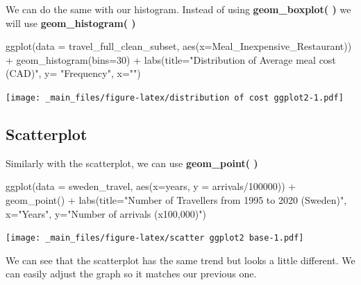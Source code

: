 \documentclass[
]{book}
\newenvironment{Shaded}{\begin{snugshade}}{\end{snugshade}}
\newcommand{\AttributeTok}[1]{\textcolor[rgb]{0.77,0.63,0.00}{#1}}
\newcommand{\DecValTok}[1]{\textcolor[rgb]{0.00,0.00,0.81}{#1}}
\newcommand{\FunctionTok}[1]{\textcolor[rgb]{0.00,0.00,0.00}{#1}}
\newcommand{\NormalTok}[1]{#1}
\newcommand{\SpecialCharTok}[1]{\textcolor[rgb]{0.00,0.00,0.00}{#1}}
\newcommand{\StringTok}[1]{\textcolor[rgb]{0.31,0.60,0.02}{#1}}
\begin{document}
We can do the same with our histogram. Instead of using \textbf{geom\_boxplot( )} we will use \textbf{geom\_histogram( )}

\begin{Shaded}
\begin{Highlighting}[]
\FunctionTok{ggplot}\NormalTok{(}\AttributeTok{data =}\NormalTok{ travel\_full\_clean\_subset, }\FunctionTok{aes}\NormalTok{(}\AttributeTok{x=}\NormalTok{Meal\_Inexpensive\_Restaurant)) }\SpecialCharTok{+} 
  \FunctionTok{geom\_histogram}\NormalTok{(}\AttributeTok{bins=}\DecValTok{30}\NormalTok{) }\SpecialCharTok{+}
  \FunctionTok{labs}\NormalTok{(}\AttributeTok{title=}\StringTok{"Distribution of Average meal cost (CAD)"}\NormalTok{,}
       \AttributeTok{y=} \StringTok{"Frequency"}\NormalTok{,}
       \AttributeTok{x=}\StringTok{""}\NormalTok{)}
\end{Highlighting}
\end{Shaded}

\texttt{[image: \_main\_files/figure-latex/distribution of cost ggplot2-1.pdf]}

\hypertarget{scatterplot}{%
\subsection{Scatterplot}\label{scatterplot}}

Similarly with the scatterplot, we can use \textbf{geom\_point( )}

\begin{Shaded}
\begin{Highlighting}[]
\FunctionTok{ggplot}\NormalTok{(}\AttributeTok{data =}\NormalTok{ sweden\_travel, }\FunctionTok{aes}\NormalTok{(}\AttributeTok{x=}\NormalTok{years, }\AttributeTok{y =}\NormalTok{ arrivals}\SpecialCharTok{/}\DecValTok{100000}\NormalTok{)) }\SpecialCharTok{+} 
  \FunctionTok{geom\_point}\NormalTok{() }\SpecialCharTok{+}
  \FunctionTok{labs}\NormalTok{(}\AttributeTok{title=}\StringTok{"Number of Travellers from 1995 to 2020 (Sweden)"}\NormalTok{,}
     \AttributeTok{x=}\StringTok{"Years"}\NormalTok{,}
     \AttributeTok{y=}\StringTok{"Number of arrivals (x100,000)"}\NormalTok{)}
\end{Highlighting}
\end{Shaded}

\texttt{[image: \_main\_files/figure-latex/scatter ggplot2 base-1.pdf]}

We can see that the scatterplot has the same trend but looks a little different. We can easily adjust the graph so it matches our previous one.
\end{document}
